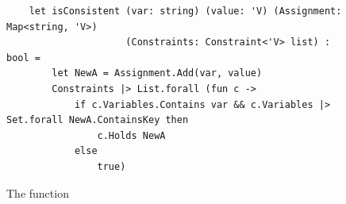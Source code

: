 \begin{figure}[!ht]
\centering
\begin{verbatim}
    let isConsistent (var: string) (value: 'V) (Assignment: Map<string, 'V>)
                     (Constraints: Constraint<'V> list) : bool =
        let NewA = Assignment.Add(var, value)
        Constraints |> List.forall (fun c ->
            if c.Variables.Contains var && c.Variables |> Set.forall NewA.ContainsKey then
                c.Holds NewA
            else
                true)
\end{verbatim}
\vspace*{-0.3cm}
\caption{The function }
\label{fig:CSP-Solver.ipynb-isConsistent}
\end{figure}

